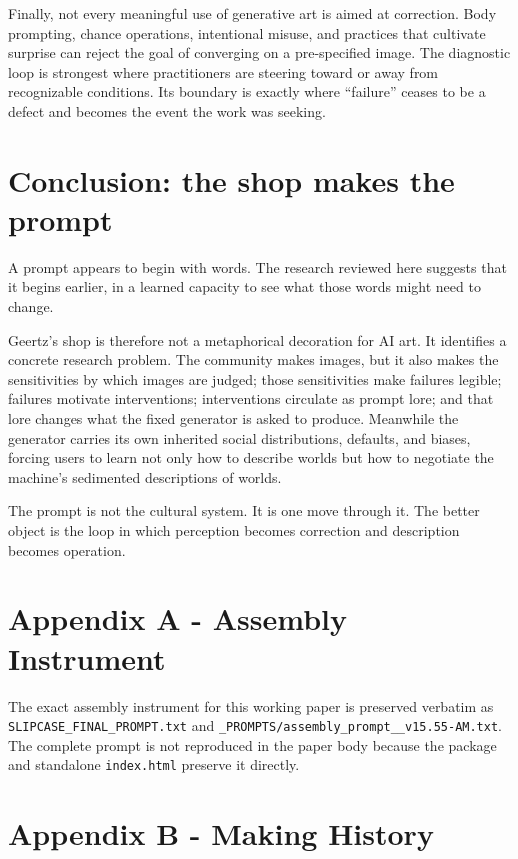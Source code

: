 \documentclass[
  11pt,
  letterpaper,
]{article}
\begin{document}
Finally, not every meaningful use of generative art is aimed at
correction. Body prompting, chance operations, intentional misuse, and
practices that cultivate surprise can reject the goal of converging on a
pre-specified image. The diagnostic loop is strongest where
practitioners are steering toward or away from recognizable conditions.
Its boundary is exactly where ``failure'' ceases to be a defect and
becomes the event the work was seeking.

\section{Conclusion: the shop makes the
prompt}\label{conclusion-the-shop-makes-the-prompt}

A prompt appears to begin with words. The research reviewed here
suggests that it begins earlier, in a learned capacity to see what those
words might need to change.

Geertz's shop is therefore not a metaphorical decoration for AI art. It
identifies a concrete research problem. The community makes images, but
it also makes the sensitivities by which images are judged; those
sensitivities make failures legible; failures motivate interventions;
interventions circulate as prompt lore; and that lore changes what the
fixed generator is asked to produce. Meanwhile the generator carries its
own inherited social distributions, defaults, and biases, forcing users
to learn not only how to describe worlds but how to negotiate the
machine's sedimented descriptions of worlds.

The prompt is not the cultural system. It is one move through it. The
better object is the loop in which perception becomes correction and
description becomes operation.

\section{Appendix A - Assembly
Instrument}\label{appendix-a---assembly-instrument}

The exact assembly instrument for this working paper is preserved
verbatim as \texttt{SLIPCASE\_FINAL\_PROMPT.txt} and
\texttt{\_PROMPTS/assembly\_prompt\_\_v15.55-AM.txt}. The complete
prompt is not reproduced in the paper body because the package and
standalone \texttt{index.html} preserve it directly.

\section{Appendix B - Making History}\label{appendix-b---making-history}
\end{document}
